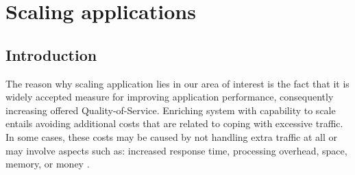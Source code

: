 \chapter{Scaling applications}

\section{Introduction}

The reason why scaling application lies in our area of interest is the fact that it is widely accepted measure for improving application performance, consequently increasing offered Quality-of-Service. Enriching system with capability to scale entails avoiding additional costs that are related to coping with excessive traffic. In some cases, these costs may be caused by not handling extra traffic at all or may involve aspects such as: increased response time, processing overhead, space, memory, or money \cite{Bo00}. 

